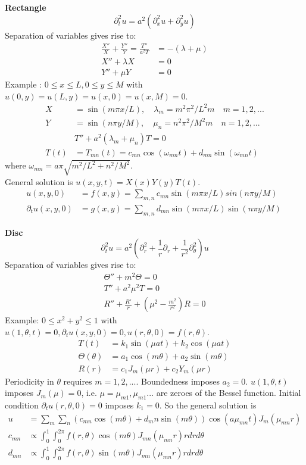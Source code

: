 \documentclass[10pt,landscape]{article}
\newcommand{\lb}{\lambda}
\newcommand{\f}{\frac}
\begin{document}
\begin{multicols}{3}
		\textbf{Rectangle} $$\partial_t^2 u = a^2 (\partial_x^2 u +\partial_y^2 u)  $$
		Separation of variables gives rise to:
		\begin{align*}
		 \f{X''}{X} + \f{Y''}{Y} = \f{T''}{a^2T} &= -(\lb + \mu) \\
			X'' + \lb X &= 0 \\ 
			Y'' + \mu Y &= 0
		\end{align*}
		Example : $0 \leq x \leq L, 0 \leq y \leq M$ with $u(0,y) = u(L,y) = u(x,0) = u(x,M) =0$.
		\begin{align*}
			X &= \sin(m\pi x /L), \quad \lb_m=m^2\pi^2 /L^2m \quad m=1,2,... \\
			Y &= \sin(n\pi y /M), \quad \mu_n=n^2\pi^2 /M^2m \quad n=1,2,... \\
			&T'' +a^2(\lb_m + \mu_n)T = 0 \\
			T(t) &= T_{mn}(t) = c_{mn}\cos(\omega_{mn} t) + d_{mn}\sin(\omega_{mn} t) 
		\end{align*} where $ \omega_{mn} = a\pi \sqrt{m^2/L^2 + n^2/M^2}$.\\
		General solution is $u(x,y,t) = X(x)Y(y)T(t)$.
		\begin{align*}
			u(x,y,0) &= f(x,y) = \sum_{m,n} c_{mn} \sin(m\pi x / L)sin(n \pi y / M)\\
			\partial_t u(x,y,0) &= g(x,y) = \sum_{m,n} d_{mn} \sin(m\pi x / L)\sin(n \pi y / M) \
		\end{align*}

		\textbf{Disc} \\
		$$ \partial_t^2 u = a^2 \left(\partial^2_r + \f{1}{r} \partial_r + \f{1}{r^2} \partial^2_{\theta}\right)u $$
		Separation of variables gives rise to:
		\begin{align*}
			\Theta'' + m^2\Theta = 0 \\
			T'' + a^2\mu^2T=0 \\
			R'' + \f{R'}{r} + \left( \mu^2 - \f{m^2}{r^2} \right) R = 0 
		\end{align*}
		Example: $ 0 \leq x^2 + y^2 \leq 1$ with $u(1,\theta,t) = 0, \partial_t u(x,y,0) = 0, u(r,\theta,0) = f(r,\theta).$ \\
		\begin{align*}
			T(t) &=k_1 \sin(\mu at) + k_2 \cos(\mu at) \\
			\Theta(\theta) &= a_1 \cos(m\theta) + a_2 \sin(m\theta) \\
			R(r) &= c_1J_m(\mu r) + c_2 Y_m(\mu r)
		\end{align*}
		Periodicity in $\theta$ requires $m=1,2,...$. Boundedness imposes $a_2 = 0$. $u(1,\theta,t)$ imposes $J_m(\mu) = 0$, i.e. $\mu = \mu_{m1}, \mu_{m1}...$ are zeroes of the Bessel function. Initial condition $\partial_t u(r,\theta,0) = 0$ imposes $k_1=0$. So the general solution is 
		\begin{align*}
			u &= \sum_m \sum_n (c_{mn}\cos(m\theta) + d_mn \sin(m\theta))\cos(a\mu_{mn}t)J_m(\mu_{mn} r) \\
			c_{mn} &\propto \int_0^1 \int_0^{2\pi} f(r,\theta) \cos(m\theta) J_{mn}(\mu_{mn}r)r dr d\theta \\
			d_{mn} &\propto \int_0^1 \int_0^{2\pi} f(r,\theta) \sin(m\theta) J_{mn}(\mu_{mn}r)r dr d\theta 
		\end{align*}


\end{multicols}
\end{document}
